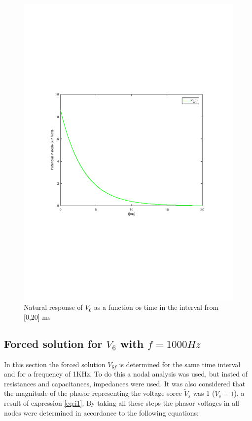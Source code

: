 \begin{figure}[H] \centering
\includegraphics[width=0.9\linewidth]{natural_tab.pdf}
\caption{Natural response of $V_6$ as a function os time in the interval from [0,20] ms}
\label{fig:natural}
\end{figure} 


\pagebreak
\subsection{Forced solution for $V_6$ with $f=1000Hz$}

In this section the forced solution $V_{6f}$ is determined for the same time interval and for a frequency of 1KHz. To do this a nodal analysis was used, but insted of resistances and capacitances, impedances were used. It was also  considered that the magnitude of the phasor representing the voltage sorce $\tilde{V}_s$ was 1 ($V_s=1$), a result of expression \ref{eq:i1}. By taking all these steps the phasor voltages in all nodes were determined in accordance to the following equations:

